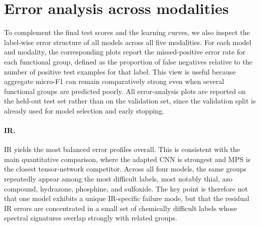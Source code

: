 \section{Error analysis across modalities}
\label{app:error_analysis_all}

To complement the final test scores and the learning curves, we also inspect the
label-wise error structure of all models across all five modalities.
For each model and modality, the corresponding plots report the missed-positive
error rate for each functional group, defined as the proportion of false
negatives relative to the number of positive test examples for that label.
This view is useful because aggregate micro-F1 can remain comparatively strong
even when several functional groups are predicted poorly.
All error-analysis plots are reported on the held-out test set rather than on
the validation set, since the validation split is already used for model
selection and early stopping.

\paragraph{IR.}
IR yields the most balanced error profiles overall.
This is consistent with the main quantitative comparison, where the adapted CNN
 is strongest and MPS is the closest tensor-network competitor.
Across all four models, the same groups repeatedly appear among the most
difficult labels, most notably thial, azo compound, hydrazone, phosphine, and
sulfoxide.
The key point is therefore not that one model exhibits a unique IR-specific
failure mode, but that the residual IR errors are concentrated in a small set of
chemically difficult labels whose spectral signatures overlap strongly with
related groups.

